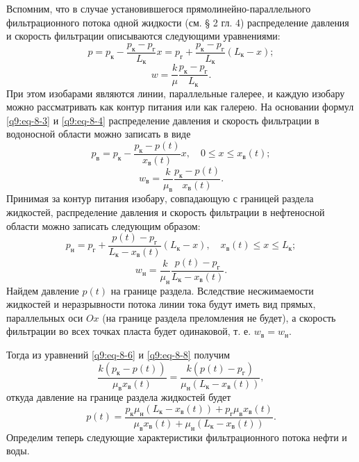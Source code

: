 Вспомним, что в случае установившегося прямолинейно-параллельного фильтрационного потока одной жидкости (см. § 2 гл. 4) распределение давления и скорость фильтрации описываются следующими уравнениями:
\begin{equation}p=p_\text{к}-\frac{p_\text{к}-p_\text{г}}{L_\text{к}}x=p_\text{г}+\frac{p_\text{к}-p_\text{г}}{L_\text{к}}(L_\text{к}-x);\tag{8.3}\label{q9:eq-8-3}\end{equation}
\begin{equation}w=\frac{k}{\mu}\frac{p_\text{к}-p_\text{г}}{L_\text{к}}.\tag{8.4}\label{q9:eq-8-4}\end{equation}
При этом изобарами являются линии, параллельные галерее, и каждую изобару можно рассматривать как контур питания или как галерею. На основании формул \eqref{q9:eq-8-3} и \eqref{q9:eq-8-4} распределение давления и скорость фильтрации в водоносной области можно записать в виде
\begin{equation}p_\text{в}=p_\text{к}-\frac{p_\text{к}-p(t)}{x_\text{в}(t)}x,\quad0\le x\le x_\text{в}(t);\tag{8.5}\label{q9:eq-8-5}\end{equation}
\begin{equation}w_\text{в}=\frac{k}{\mu_\text{в}}\frac{p_\text{к}-p(t)}{x_\text{в}(t)}.\tag{8.6}\label{q9:eq-8-6}\end{equation}
Принимая за контур питания изобару, совпадающую с границей раздела жидкостей, распределение давления и скорость фильтрации в нефтеносной области можно записать следующим образом:
\begin{equation}p_\text{н}=p_\text{г}+\frac{p(t)-p_\text{г}}{L_\text{к}-x_\text{в}(t)}(L_\text{к}-x),\quad x_\text{в}(t)\le x\le L_\text{к};\tag{8.7}\label{q9:eq-8-7}\end{equation}
\begin{equation}w_\text{н}=\frac{k}{\mu_\text{н}}\frac{p(t)-p_\text{г}}{L_\text{к}-x_\text{в}(t)}.\tag{8.8}\label{q9:eq-8-8}\end{equation}
Найдем давление $p(t)$ на границе раздела. Вследствие несжимаемости жидкостей и неразрывности потока линии тока будут иметь вид прямых, параллельных оси $Ox$ (на границе раздела преломления не будет), а скорость фильтрации во всех точках пласта будет одинаковой, т. е. $w_\text{в}=w_\text{н}$.

Тогда из уравнений \eqref{q9:eq-8-6} и \eqref{q9:eq-8-8} получим
\begin{equation}\frac{k(p_\text{к}-p(t))}{\mu_\text{в}x_\text{в}(t)}=\frac{k(p(t)-p_\text{г})}{\mu_\text{н}(L_\text{к}-x_\text{в}(t))},\tag{8.9}\label{q9:eq-8-9}\end{equation}
откуда давление на границе раздела жидкостей будет
\begin{equation}p(t)=\frac{p_\text{к}\mu_\text{н}(L_\text{к}-x_\text{в}(t))+p_\text{г}\mu_\text{в}x_\text{в}(t)}{\mu_\text{в}x_\text{в}(t)+\mu_\text{н}(L_\text{к}-x_\text{в}(t))}.\tag{8.10}\label{q9:eq-8-10}\end{equation}
Определим теперь следующие характеристики фильтрационного потока нефти и воды.

